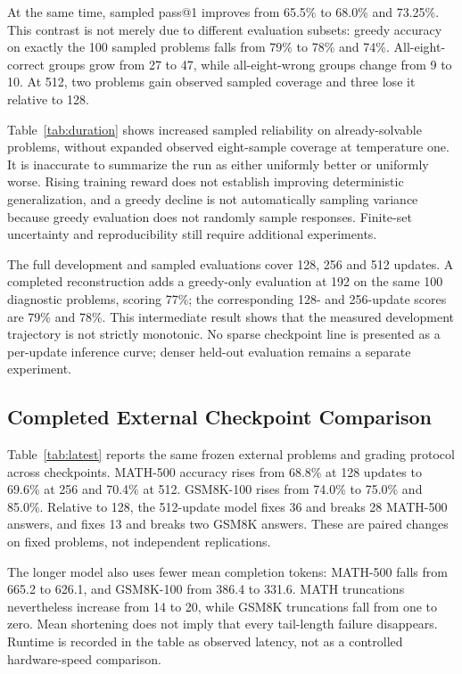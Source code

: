 \documentclass[conference]{IEEEtran}
\begin{document}
At the same time, sampled pass@1 improves from 65.5\% to 68.0\% and 73.25\%. This contrast is not merely due to different evaluation subsets: greedy accuracy on exactly the 100 sampled problems falls from 79\% to 78\% and 74\%. All-eight-correct groups grow from 27 to 47, while all-eight-wrong groups change from 9 to 10. At 512, two problems gain observed sampled coverage and three lose it relative to 128.

Table~\ref{tab:duration} shows increased sampled reliability on already-solvable problems, without expanded observed eight-sample coverage at temperature one. It is inaccurate to summarize the run as either uniformly better or uniformly worse. Rising training reward does not establish improving deterministic generalization, and a greedy decline is not automatically sampling variance because greedy evaluation does not randomly sample responses. Finite-set uncertainty and reproducibility still require additional experiments.

The full development and sampled evaluations cover 128, 256 and 512 updates. A completed reconstruction adds a greedy-only evaluation at 192 on the same 100 diagnostic problems, scoring 77\%; the corresponding 128- and 256-update scores are 79\% and 78\%. This intermediate result shows that the measured development trajectory is not strictly monotonic. No sparse checkpoint line is presented as a per-update inference curve; denser held-out evaluation remains a separate experiment.

\subsection{Completed External Checkpoint Comparison}


Table~\ref{tab:latest} reports the same frozen external problems and grading protocol across checkpoints. MATH-500 accuracy rises from 68.8\% at 128 updates to 69.6\% at 256 and 70.4\% at 512. GSM8K-100 rises from 74.0\% to 75.0\% and 85.0\%. Relative to 128, the 512-update model fixes 36 and breaks 28 MATH-500 answers, and fixes 13 and breaks two GSM8K answers. These are paired changes on fixed problems, not independent replications.

The longer model also uses fewer mean completion tokens: MATH-500 falls from 665.2 to 626.1, and GSM8K-100 from 386.4 to 331.6. MATH truncations nevertheless increase from 14 to 20, while GSM8K truncations fall from one to zero. Mean shortening does not imply that every tail-length failure disappears. Runtime is recorded in the table as observed latency, not as a controlled hardware-speed comparison.
\end{document}
